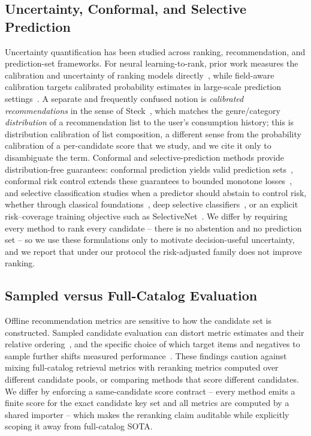 \subsection{Uncertainty, Conformal, and Selective Prediction}

Uncertainty quantification has been studied across ranking, recommendation, and
prediction-set frameworks. For neural learning-to-rank, prior work measures the
calibration and uncertainty of ranking models directly~\cite{penha2021calibration},
while field-aware calibration targets calibrated probability estimates in
large-scale prediction settings~\cite{pan2020fieldaware}. A separate and
frequently confused notion is \emph{calibrated recommendations} in the sense of
Steck~\cite{steck2018calibrated}, which matches the genre/category
\emph{distribution} of a recommendation list to the user's consumption history;
this is distribution calibration of list composition, a different sense from the
probability calibration of a per-candidate score that we study, and we cite it
only to disambiguate the term. Conformal and selective-prediction methods
provide distribution-free guarantees: conformal prediction yields valid
prediction sets~\cite{angelopoulos2021gentle}, conformal risk control extends
these guarantees to bounded monotone losses~\cite{angelopoulos2024crc}, and
selective classification studies when a predictor should abstain to control
risk, whether through classical foundations~\cite{elyaniv2010foundations},
deep selective classifiers~\cite{geifman2017selective}, or an explicit
risk--coverage training objective such as SelectiveNet~\cite{geifman2019selectivenet}.
We differ by requiring every method to rank every candidate -- there is no
abstention and no prediction set -- so we use these formulations only to
motivate decision-useful uncertainty, and we report that under our protocol the
risk-adjusted family does not improve ranking.

\subsection{Sampled versus Full-Catalog Evaluation}

Offline recommendation metrics are sensitive to how the candidate set is
constructed. Sampled candidate evaluation can distort metric estimates and
their relative ordering~\cite{krichene2020sampled}, and the specific choice of
which target items and negatives to sample further shifts measured
performance~\cite{canamares2020target}. These findings caution against mixing
full-catalog retrieval metrics with reranking metrics computed over different
candidate pools, or comparing methods that score different candidates.
We differ by enforcing a same-candidate score contract -- every method emits a
finite score for the exact candidate key set and all metrics are computed by a
shared importer -- which makes the reranking claim auditable while explicitly
scoping it away from full-catalog SOTA.
